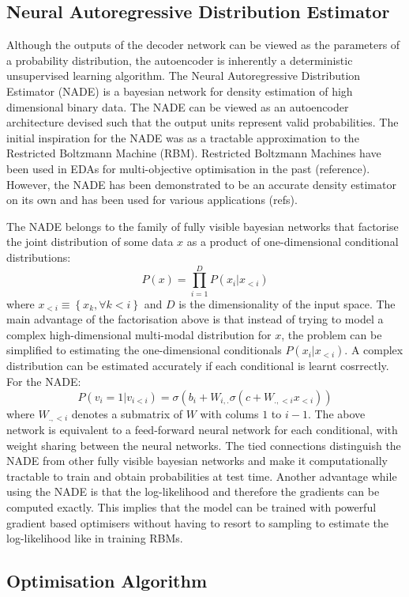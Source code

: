 \documentclass[twoside]{article}
\begin{document}
\subsection{Neural Autoregressive Distribution Estimator}

Although the outputs of the decoder network can be viewed as the parameters of a probability distribution, the autoencoder is inherently a deterministic unsupervised learning algorithm. The Neural Autoregressive Distribution Estimator (NADE) is a bayesian network for density estimation of high dimensional binary data. The NADE can be viewed as an autoencoder architecture devised such that the output units represent valid probabilities. The initial inspiration for the NADE was as a tractable approximation to the Restricted Boltzmann Machine (RBM). Restricted Boltzmann Machines have been used in EDAs for multi-objective optimisation in the past (reference). However, the NADE has been demonstrated to be an accurate density estimator on its own and has been used for various applications (refs). 

The NADE belongs to the family of fully visible bayesian networks that factorise the joint distribution of some data $x$ as a product of one-dimensional conditional distributions:
$$ P(x) = \prod_{i=1}^{D} P(x_i|x_{<i})$$ where $x_{<i} \equiv \left\{ x_k, \forall k < i \right\} $  and $D$ is the dimensionality of the input space. The main advantage of the factorisation above is that instead of trying to model a complex high-dimensional multi-modal distribution for $x$, the problem can be simplified to estimating the one-dimensional conditionals $P(x_i|x_{<i})$. A complex distribution can be estimated accurately if each conditional is learnt cosrrectly. For the NADE: 
$$P(v_i=1|v_{i<i}) =  \sigma(b_i + W_{i,.}\sigma(c+W_{.,<i}x_{<i}))$$ where $W_{.,<i}$ denotes a submatrix of $W$ with colums $1$ to $i-1$. 
The above network is equivalent to a feed-forward neural network for each conditional, with weight sharing between the neural networks. The tied connections distinguish the NADE from other fully visible bayesian networks and make it computationally tractable to train and obtain probabilities at test time. Another advantage while using the NADE is that the log-likelihood and therefore the gradients can be computed exactly. This implies that the model can be trained with powerful gradient based optimisers without having to resort to sampling to estimate the log-likelihood like in training RBMs. 


\subsection{Optimisation Algorithm}
\end{document}
